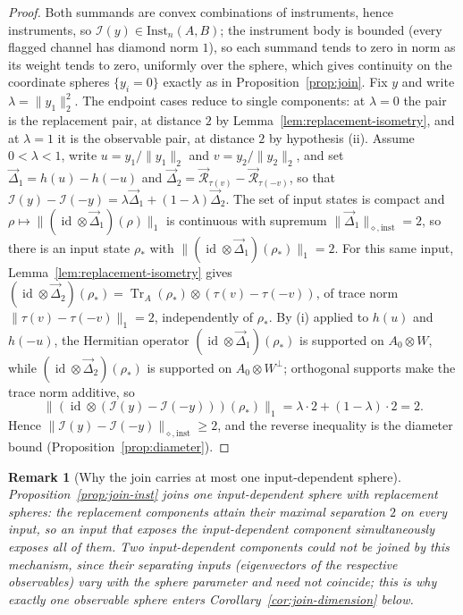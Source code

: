 \documentclass[11pt,a4paper]{article}
\newtheorem{remark}[theorem]{Remark}
\newcommand{\Inst}{\mathrm{Inst}}
\newcommand{\Tr}{\operatorname{Tr}}
\newcommand{\id}{\operatorname{id}}
\newcommand{\vD}{\vec{\Delta}}
\begin{document}
\begin{proof}
Both summands are convex combinations of instruments, hence instruments, so $\mathcal I(y)\in\Inst_n(A,B)$; the instrument body is bounded (every flagged channel has diamond norm $1$), so each summand tends to zero in norm as its weight tends to zero, uniformly over the sphere, which gives continuity on the coordinate spheres $\{y_i=0\}$ exactly as in Proposition~\ref{prop:join}. Fix $y$ and write $\lambda=\|y_1\|_2^2$. The endpoint cases reduce to single components: at $\lambda=0$ the pair is the replacement pair, at distance $2$ by Lemma~\ref{lem:replacement-isometry}, and at $\lambda=1$ it is the observable pair, at distance $2$ by hypothesis (ii). Assume $0<\lambda<1$, write $u=y_1/\|y_1\|_2$ and $v=y_2/\|y_2\|_2$, and set $\vD_1=h(u)-h(-u)$ and $\vD_2=\vec{\mathcal R}_{\tau(v)}-\vec{\mathcal R}_{\tau(-v)}$, so that $\mathcal I(y)-\mathcal I(-y)=\lambda\vD_1+(1-\lambda)\vD_2$. The set of input states is compact and $\rho\mapsto\|(\id\otimes\vD_1)(\rho)\|_1$ is continuous with supremum $\|\vD_1\|_{\diamond,\mathrm{inst}}=2$, so there is an input state $\rho_*$ with $\|(\id\otimes\vD_1)(\rho_*)\|_1=2$. For this same input, Lemma~\ref{lem:replacement-isometry} gives $(\id\otimes\vD_2)(\rho_*)=\Tr_A(\rho_*)\otimes(\tau(v)-\tau(-v))$, of trace norm $\|\tau(v)-\tau(-v)\|_1=2$, independently of $\rho_*$. By (i) applied to $h(u)$ and $h(-u)$, the Hermitian operator $(\id\otimes\vD_1)(\rho_*)$ is supported on $A_0\otimes W$, while $(\id\otimes\vD_2)(\rho_*)$ is supported on $A_0\otimes W^{\perp}$; orthogonal supports make the trace norm additive, so
\[
\big\|(\id\otimes(\mathcal I(y)-\mathcal I(-y)))(\rho_*)\big\|_1
=\lambda\cdot2+(1-\lambda)\cdot2=2.
\]
Hence $\|\mathcal I(y)-\mathcal I(-y)\|_{\diamond,\mathrm{inst}}\ge2$, and the reverse inequality is the diameter bound (Proposition~\ref{prop:diameter}).
\end{proof}

\begin{remark}[Why the join carries at most one input-dependent sphere]
\label{rem:join-one-observable}
Proposition~\ref{prop:join-inst} joins one \emph{input-dependent} sphere with replacement spheres: the replacement components attain their maximal separation $2$ on \emph{every} input, so an input that exposes the input-dependent component simultaneously exposes all of them. Two input-dependent components could not be joined by this mechanism, since their separating inputs (eigenvectors of the respective observables) vary with the sphere parameter and need not coincide; this is why exactly one observable sphere enters Corollary~\ref{cor:join-dimension} below.
\end{remark}
\end{document}
